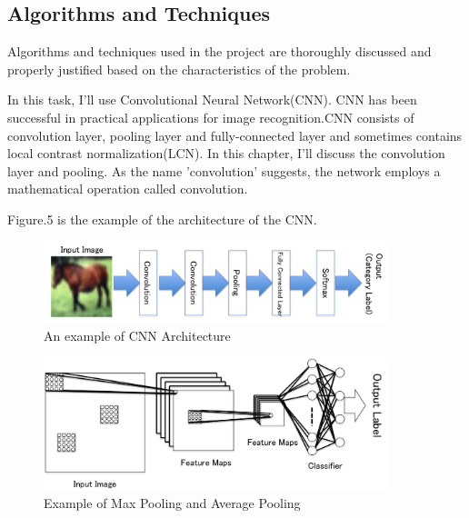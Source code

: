 \subsection{Algorithms and Techniques}
Algorithms and techniques used in the project are thoroughly discussed and properly justified based on the characteristics of the problem.

In this task, I'll use Convolutional Neural Network(CNN). CNN has been successful in  practical applications for image recognition.CNN consists of convolution layer, pooling layer and fully-connected layer and sometimes contains local contrast normalization(LCN). In this chapter, I'll discuss the convolution layer and pooling.
As the name 'convolution' suggests, the network employs a mathematical operation called convolution. 

Figure.5 is the example of the architecture of the CNN.
\begin{figure}[htbp]

	\begin{center}
	\includegraphics[width=10cm]{picture/Architecture_of_CNN.png}
	\caption{An example of CNN Architecture}
	\end{center}
	\label{fig:five}

\end{figure}




\begin{figure}[htbp]

	\begin{center}
	\includegraphics[width=10cm]{picture/Structure_of_convolution.png}
	\caption{Example of Max Pooling and Average Pooling}
	\end{center}
	\label{fig:six}

\end{figure}

